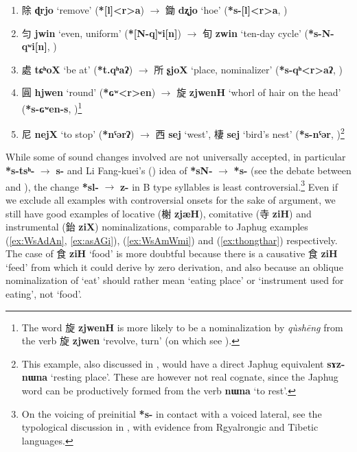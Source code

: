 \documentclass[oneside,a4paper,11pt]{article}
\newcommand{\ipa}[1]{\textbf{{\phon\mbox{#1}}}} %
\newcommand{\zh}[1]{{\cn #1}}
\newcommand{\zhc}[2]{\zh{#1} \ipa{#2}}
\begin{document}
\begin{enumerate}
\item \zhc{除}{ɖrjo} ‘remove’ (\ipa{*[l]<r>a}) $\rightarrow$ \zhc{鋤}{dʐjo} ‘hoe’ (\ipa{*s-[l]<r>a}, \citealt[81]{bs14oc})
\item \zhc{匀}{jwin} ‘even, uniform’ (\ipa{*[N-q]ʷi[n]}) $\rightarrow$ \zhc{旬}{zwin} ‘ten-day cycle’ (\ipa{*s-N-qʷi[n]}, \citealt[127]{bs14oc})
\item \zhc{處}{tɕʰoX} ‘be at’ (\ipa{*t.qʰaʔ}) $\rightarrow$ \zhc{所}{ʂjoX} ‘place, nominalizer’ (\ipa{*s-qʰ<r>aʔ}, \citealt[130]{bs14oc})
\item \zhc{圓}{hjwen} ‘round’ (\ipa{*ɢʷ<r>en}) $\rightarrow$ \zhc{旋}{zjwenH} ‘whorl of hair on the head’ (\ipa{*s-ɢʷen-s}, \citealt[141]{bs14oc})\footnote{The word \zhc{旋}{zjwenH} is more likely to be a nominalization by \textit{qùshēng} from the verb \zhc{旋}{zjwen} `revolve, turn' (on which see \citealt{downer59, jacques16ssuffixes}). }
\item \zhc{尼}{nejX} ‘to stop’ (\ipa{*nˤərʔ}) $\rightarrow$ \zhc{西}{sej} ‘west’, \zhc{棲}{sej} ‘bird’s nest’  (\ipa{*s-nˤər}, \citealt[147]{bs14oc})\footnote{This example, also discussed in \citet{sagart04directions}, would have a direct Japhug equivalent \ipa{sɤz-nɯna} `resting place'. These are however not real cognate, since the Japhug word can be productively formed from the verb  \ipa{nɯna} `to rest'.}
\end{enumerate}
 
  
While some of sound changes involved are not universally accepted, in particular \ipa{*s-tsʰ-} $\rightarrow$ \ipa{s-} and Li Fang-kuei's (\citealt{lifk71shanggu}) idea of \ipa{*sN-} $\rightarrow$ \ipa{*s-} (see the debate between  \citealt{mei12caus} and \citealt{sagart12sprefix}), the change \ipa{*sl-} $\rightarrow$ \ipa{z-} in B type syllables is least controversial.\footnote{On the voicing of preinitial \ipa{*s-} in contact with a voiced lateral, see the typological discussion in \citet{gong16ld}, with evidence from Rgyalrongic and Tibetic languages.} Even if we exclude all examples with controversial onsets for the sake of argument, we still have good examples of locative (\zhc{榭}{zjæH}), comitative (\zhc{寺}{ziH}) and instrumental (\zhc{鈶}{ziX}) nominalizations, comparable to Japhug examples (\ref{ex:WsAdAn}, \ref{ex:asAGi}), (\ref{ex:WsAmWmi}) and (\ref{ex:thongthar}) respectively. The case of \zhc{食}{ziH} `food' is more doubtful because there is a causative \zhc{食}{ziH} `feed' from which it could derive by zero derivation, and also because an oblique nominalization of `eat' should rather mean `eating place' or `instrument used for eating', not `food'.
\end{document}
